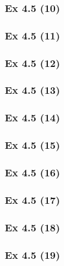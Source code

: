 \subsubsection{Ex 4.5 (10)}\label{sec:Ex_4.5.10}

\newpage		%

\subsubsection{Ex 4.5 (11)}\label{sec:Ex_4.5.11}

\subsubsection{Ex 4.5 (12)}\label{sec:Ex_4.5.12}

\subsubsection{Ex 4.5 (13)}\label{sec:Ex_4.5.13}

\subsubsection{Ex 4.5 (14)}\label{sec:Ex_4.5.14}

\subsubsection{Ex 4.5 (15)}\label{sec:Ex_4.5.15}

\subsubsection{Ex 4.5 (16)}\label{sec:Ex_4.5.16}

\subsubsection{Ex 4.5 (17)}\label{sec:Ex_4.5.17}

\subsubsection{Ex 4.5 (18)}\label{sec:Ex_4.5.18}

\subsubsection{Ex 4.5 (19)}\label{sec:Ex_4.5.19}

